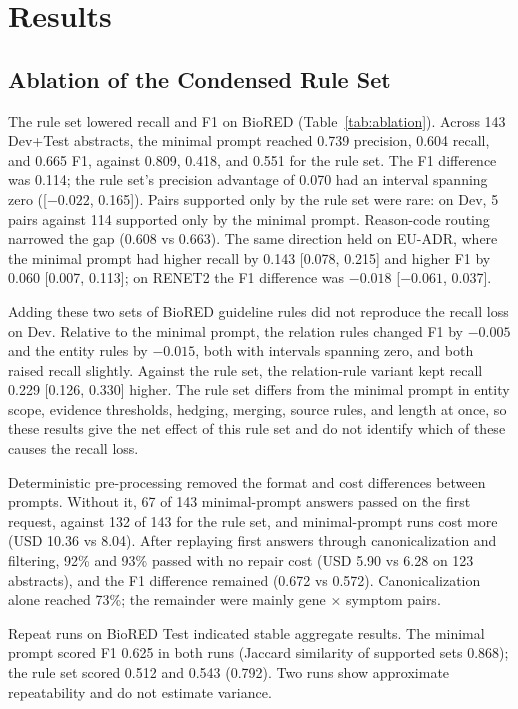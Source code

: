 \documentclass[preprint,10pt,letterpaper]{elsarticle}
\begin{document}
\section{Results}

\subsection{Ablation of the Condensed Rule Set}
The rule set lowered recall and F1 on BioRED (Table~\ref{tab:ablation}). Across 143 Dev+Test abstracts, the minimal prompt reached 0.739 precision, 0.604 recall, and 0.665 F1, against 0.809, 0.418, and 0.551 for the rule set. The F1 difference was 0.114; the rule set's precision advantage of 0.070 had an interval spanning zero ([$-0.022$, 0.165]). Pairs supported only by the rule set were rare: on Dev, 5 pairs against 114 supported only by the minimal prompt. Reason-code routing narrowed the gap (0.608 vs 0.663). The same direction held on EU-ADR, where the minimal prompt had higher recall by 0.143 [0.078, 0.215] and higher F1 by 0.060 [0.007, 0.113]; on RENET2 the F1 difference was $-0.018$ [$-0.061$, 0.037].

Adding these two sets of BioRED guideline rules did not reproduce the recall loss on Dev. Relative to the minimal prompt, the relation rules changed F1 by $-0.005$ and the entity rules by $-0.015$, both with intervals spanning zero, and both raised recall slightly. Against the rule set, the relation-rule variant kept recall 0.229 [0.126, 0.330] higher. The rule set differs from the minimal prompt in entity scope, evidence thresholds, hedging, merging, source rules, and length at once, so these results give the net effect of this rule set and do not identify which of these causes the recall loss.

Deterministic pre-processing removed the format and cost differences between prompts. Without it, 67 of 143 minimal-prompt answers passed on the first request, against 132 of 143 for the rule set, and minimal-prompt runs cost more (USD 10.36 vs 8.04). After replaying first answers through canonicalization and filtering, 92\% and 93\% passed with no repair cost (USD 5.90 vs 6.28 on 123 abstracts), and the F1 difference remained (0.672 vs 0.572). Canonicalization alone reached 73\%; the remainder were mainly gene $\times$ symptom pairs.

Repeat runs on BioRED Test indicated stable aggregate results. The minimal prompt scored F1 0.625 in both runs (Jaccard similarity of supported sets 0.868); the rule set scored 0.512 and 0.543 (0.792). Two runs show approximate repeatability and do not estimate variance.
\end{document}
